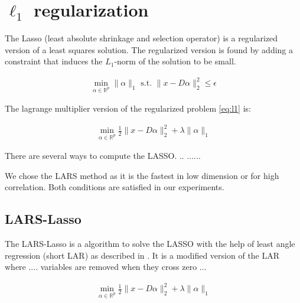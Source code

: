 \section {$\ell_1$ regularization}



The Lasso (least absolute shrinkage and selection operator) is a regularized version of a least squares solution.
The regularized version is found by adding a constraint that induces the $L_1$-norm of the solution to be small. \cite{Tibshirani1996}

\begin{align}
\min_{\alpha\in\mathbb{R}^{p}}   \lVert \alpha \rVert_{1}   \textrm{ s.t. } \lVert x - D\alpha \rVert^{2}_{2} \leq \epsilon\label{eq:l1}
\end{align}

The lagrange multiplier version of the regularized problem \ref{eq:l1} is:

\begin{align}
\min_{\alpha\in\mathbb{R}^{p}}  \frac{1}{2} \lVert x - D\alpha \rVert^{2}_{2} + \lambda \lVert \alpha \rVert_{1}
\end{align}

There are several ways to compute the LASSO. .. ...... 


We chose the LARS method as it is the fastest in low dimension or for high correlation. Both conditions are satisfied in our experiments.

\subsection {LARS-Lasso}
\label{sec:lars}
The LARS-Lasso is a algorithm to solve the LASSO with the help of least angle regression (short LAR)
as described in \cite{Efron2004}. It is a modified version of the LAR where .... variables are removed when they cross zero ...


\begin{align}
\min_{\alpha\in\mathbb{R}^{p}}  \frac{1}{2} \lVert x - D\alpha \rVert^{2}_{2} + \lambda \lVert \alpha \rVert_{1}
\end{align}

